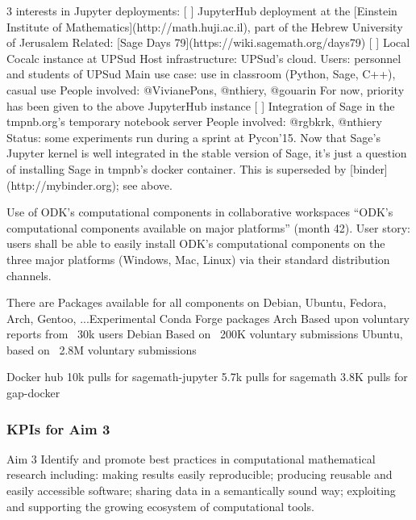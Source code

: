\begin{Aim 1}
\begin{Aim 2}
\begin{itemize}
  
  3 interests in Jupyter deployments:
  [ ] JupyterHub deployment at the [Einstein Institute of Mathematics](http://math.huji.ac.il), part of the Hebrew University of Jerusalem
      Related: [Sage Days 79](https://wiki.sagemath.org/days79)
  [ ] Local Cocalc instance at UPSud
      Host infrastructure: UPSud's cloud.
      Users: personnel and students of UPSud
      Main use case: use in classroom (Python, Sage, C++), casual use
      People involved: @VivianePons, @nthiery, @gouarin 
      For now, priority has been given to the above JupyterHub instance
  [ ] Integration of Sage in the tmpnb.org's temporary notebook server
      People involved: @rgbkrk, @nthiery
      Status: some experiments run during a sprint at Pycon'15. Now that Sage's
      Jupyter kernel is well integrated in the stable version of Sage, it's just a question
      of installing Sage in tmpnb's docker container.
      This is superseded by [binder](http://mybinder.org); see above.
\end{itemize}

Use of ODK's computational components in collaborative workspaces
“ODK’s computational components available on major platforms” (month 42).
       User story: users shall be able to easily install ODK’s computational components on the three major platforms (Windows, Mac, Linux)
       via their standard distribution channels.
       
       There are Packages available for all components on Debian, Ubuntu, Fedora, Arch, Gentoo, ...Experimental Conda Forge packages  %
      Arch Based upon voluntary reports from ~30k users %
      Debian Based on ~200K voluntary submissions %
      Ubuntu, based on ~2.8M voluntary submissions %
      
      Docker hub 
          10k pulls for sagemath-jupyter
          5.7k pulls for sagemath
          3.8K pulls for gap-docker

      
\subsubsection{KPIs for Aim 3}

\begin{recommendation}{Aim 3}
  Identify and promote best practices in computational mathematical research including: making results easily reproducible; producing
  reusable and easily accessible software; sharing data in a semantically sound way; exploiting and supporting the growing
  ecosystem of computational tools.
\end{recommendation}


\end{Aim 2}
\end{Aim 1}

